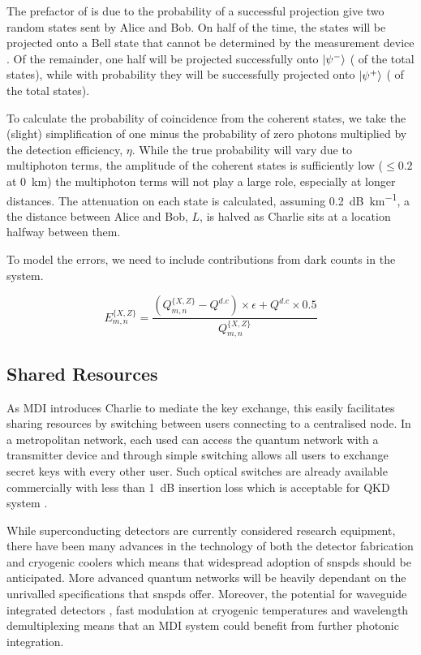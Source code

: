The prefactor of  is due to the probability of a successful projection give two random states sent by Alice and Bob. On half of the time, the states will be projected onto a Bell state that cannot be determined by the measurement device \cite{}. Of the remainder, one half will be projected successfully onto $\ket{\psi^-}$ ( of the total states), while with probability  they will be successfully projected onto $\ket{\psi^+}$ ( of the total states). 

To calculate the probability of coincidence from the coherent states, we take the (slight) simplification of one minus the probability of zero photons multiplied by the detection efficiency, $\eta$. While the true probability will vary due to multiphoton terms, the amplitude of the coherent states is sufficiently low ($\le 0.2$ at \SI{0}{\km}) the multiphoton terms will not play a large role, especially at longer distances. The attenuation on each state is calculated, assuming \SI{0.2}{dB\per\km}, a the distance between Alice and Bob, $L$, is halved as Charlie sits at a location halfway between them.

To model the errors, we need to include contributions from dark counts in the system.

\begin{equation}
	E^{\{X,Z\}}_{m,n} = \frac{\left(Q^{\{X,Z\}}_{m,n} - Q^{d.c}\right) \times \epsilon + Q^{d.c} \times 0.5}{Q^{\{X,Z\}}_{m,n}}
\end{equation}



\subsection{Shared Resources}

As \ac{MDI} introduces Charlie to mediate the key exchange, this easily facilitates sharing resources by switching between users connecting to a centralised node. In a metropolitan network, each used can access the quantum network with a transmitter device and through simple switching allows all users to exchange secret keys with every other user. Such optical switches are already available commercially with less than \SI{1}{dB} insertion loss which is acceptable for \ac{QKD} system \cite{polatis}. 

While superconducting detectors are currently considered research equipment, there have been many advances in the technology of both the detector fabrication and cryogenic coolers which means that widespread adoption of \acp{snspd} should be anticipated. More advanced quantum networks will be heavily dependant on the unrivalled specifications that \acp{snspd} offer. Moreover, the potential for waveguide integrated detectors \cite{sprengers2011, vetter2016, yun2019}, fast modulation at cryogenic temperatures \cite{eltes2019} and wavelength demultiplexing \cite{sugita2000} means that an \ac{MDI} system could benefit from further photonic integration.

